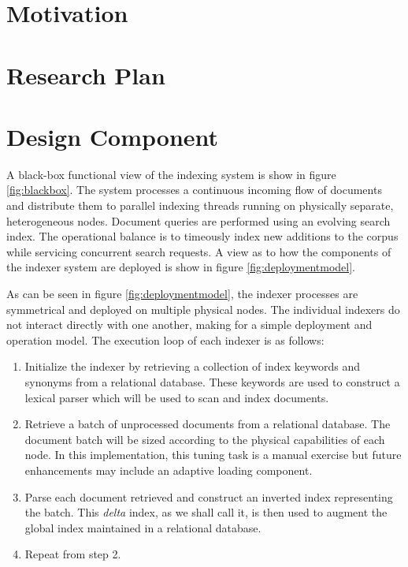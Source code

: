 \documentclass[10pt]{report}
\begin{document}
\section{Motivation}
\label{sec:motivation}


\section{Research Plan}
\label{sec:researchplan}


\section{Design Component}
\label{sec:designcomponent}
A black-box functional view of the indexing system is show in figure
\ref{fig:blackbox}. The system processes a continuous incoming flow of
documents and distribute them to parallel indexing threads running on
physically separate, heterogeneous nodes.  Document queries are performed
using an evolving search index. The operational balance is to
timeously index new additions to the corpus while servicing concurrent
search requests. A view as to how the components of the indexer system
are deployed is show in figure \ref{fig:deploymentmodel}.

As can be seen in figure \ref{fig:deploymentmodel}, the indexer
processes are symmetrical and deployed on multiple physical nodes. The
individual indexers do not interact directly with one another, making
for a simple deployment and operation model. The execution loop of
each indexer is as follows:

\begin{enumerate}
\item Initialize the indexer by retrieving a collection of index
  keywords and synonyms from a relational database. These keywords are
  used to construct a lexical parser which will be used to scan and
  index documents.
\item Retrieve a batch of unprocessed documents from a relational
  database. The document batch will be sized according to the physical
  capabilities of each node. In this implementation, this tuning task
  is a manual exercise but future enhancements may include an adaptive
  loading component.
\item Parse each document retrieved and construct an inverted index
  representing the batch. This \textit{delta} index, as we shall call
  it, is then used to augment the global index maintained in a
  relational database.
\item Repeat from step 2.
\end{enumerate}
\end{document}
